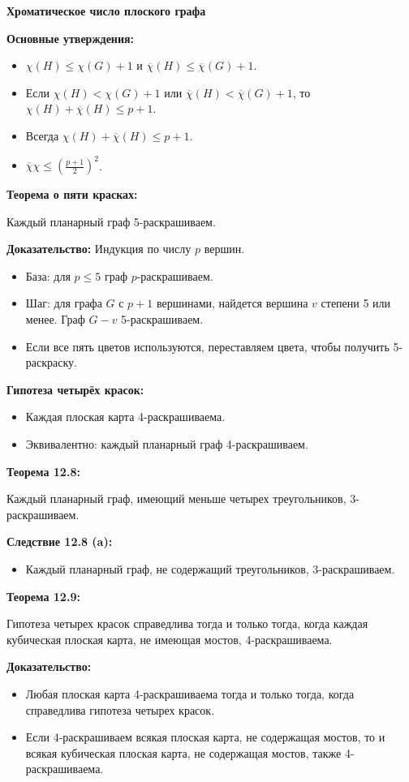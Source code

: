 \textbf{Хроматическое число плоского графа}

\noindent\textbf{Основные утверждения:}
\begin{itemize}
    \item \(\chi(H) \leq \chi(G) + 1\) и \(\overline{\chi}(H) \leq \overline{\chi}(G) + 1\).
    \item Если \(\chi(H) < \chi(G) + 1\) или \(\overline{\chi}(H) < \overline{\chi}(G) + 1\), то \(\chi(H) + \overline{\chi}(H) \leq p + 1\).
    \item Всегда \(\chi(H) + \overline{\chi}(H) \leq p + 1\).
    \item \(\overline{\chi}\chi \leq \left(\frac{p + 1}{2}\right)^2\).
\end{itemize}

\noindent\textbf{Теорема о пяти красках:}
\begin{theorem}
Каждый планарный граф 5-раскрашиваем.
\end{theorem}

\noindent\textbf{Доказательство:} Индукция по числу $p$ вершин.
\begin{itemize}
    \item База: для $p \leq 5$ граф $p$-раскрашиваем.
    \item Шаг: для графа $G$ с $p+1$ вершинами, найдется вершина $v$ степени 5 или менее. Граф $G - v$ 5-раскрашиваем.
    \item Если все пять цветов используются, переставляем цвета, чтобы получить 5-раскраску.
\end{itemize}

\noindent\textbf{Гипотеза четырёх красок:}
\begin{itemize}
    \item Каждая плоская карта 4-раскрашиваема.
    \item Эквивалентно: каждый планарный граф 4-раскрашиваем.
\end{itemize}

\noindent\textbf{Теорема 12.8:}
\begin{theorem}
Каждый планарный граф, имеющий меньше четырех треугольников, 3-раскрашиваем.
\end{theorem}

\noindent\textbf{Следствие 12.8 (a):}
\begin{itemize}
    \item Каждый планарный граф, не содержащий треугольников, 3-раскрашиваем.
\end{itemize}

\noindent\textbf{Теорема 12.9:}
\begin{theorem}
Гипотеза четырех красок справедлива тогда и только тогда, когда каждая кубическая плоская карта, не имеющая мостов, 4-раскрашиваема.
\end{theorem}

\noindent\textbf{Доказательство:}
\begin{itemize}
    \item Любая плоская карта 4-раскрашиваема тогда и только тогда, когда справедлива гипотеза четырех красок.
    \item Если 4-раскрашиваем всякая плоская карта, не содержащая мостов, то и всякая кубическая плоская карта, не содержащая мостов, также 4-раскрашиваема.
\end{itemize}